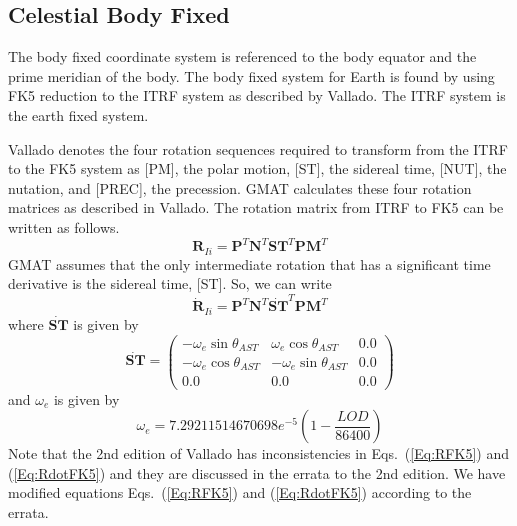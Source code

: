 {%
\subsection{Celestial Body Fixed}  \label{Sec:Fixed} 

The body fixed coordinate system is referenced to the body equator
and the prime meridian of the body.  The body fixed system for
Earth is found  by using FK5 reduction to the ITRF system as
described by Vallado.  The ITRF system is the earth fixed system.

Vallado denotes the four rotation sequences required to transform
from the ITRF to the FK5 system as [PM], the polar motion, [ST],
the sidereal time, [NUT], the nutation, and [PREC], the
precession. GMAT calculates these four rotation matrices as
described in Vallado.  The rotation matrix from ITRF to FK5 can be
written as follows.
%
\begin{equation}
     \mathbf{R}_{Ii}  = \mathbf{P}^T\mathbf{N}^T\mathbf{ST}^T\mathbf{PM}^T
     \label{Eq:RFK5}
\end{equation}
%
GMAT assumes that the only intermediate rotation that has a
significant time derivative is the sidereal time, [ST].  So, we can
write
%
\begin{equation}
     \dot{\mathbf{R}}_{Ii}  = \mathbf{P}^T\mathbf{N}^T\dot{\mathbf{ST}}^T\mathbf{PM}^T \label{Eq:RdotFK5}
\end{equation}
%
where $\dot{\mathbf{ST}}$ is given by
%
\begin{equation}
    \dot{\mathbf{ST}} =   \begin{pmatrix}
     -\omega_e\sin{\theta_{AST}}  & \omega_e\cos{\theta_{AST}} & 0.0\\
     -\omega_e\cos{\theta_{AST}} & -\omega_e\sin{\theta_{AST}} & 0.0\\
     0.0 & 0.0 & 0.0
     \end{pmatrix}
\end{equation}
%
and $\omega_e$ is given by
%
\begin{equation}
    \omega_e = 7.29211514670698e^{-5} \left( 1 - \frac{LOD}{86400}  \right) \label{Eq:EarthAngularVelocity}
\end{equation}
%
Note that the 2nd edition of Vallado\cite{vallado2} has
inconsistencies in Eqs.~(\ref{Eq:RFK5}) and (\ref{Eq:RdotFK5}) and
they are discussed in the errata to the 2nd edition.  We have
modified equations Eqs.~(\ref{Eq:RFK5}) and (\ref{Eq:RdotFK5})
according to the errata.

}
